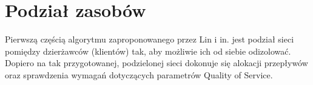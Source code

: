 \section{Podział zasobów}

Pierwszą częścią algorytmu zaproponowanego przez Lin i in. jest podział sieci pomiędzy dzierżawców (klientów) tak, aby możliwie ich od siebie odizolować. Dopiero na tak przygotowanej, podzielonej sieci dokonuje się alokacji przepływów oraz sprawdzenia wymagań dotyczących parametrów Quality of Service.
